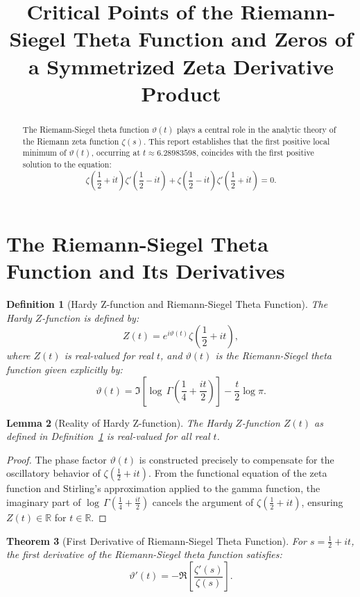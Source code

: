 \documentclass[11pt,a4paper]{article}
\title{Critical Points of the Riemann-Siegel Theta Function and Zeros of a Symmetrized Zeta Derivative Product}
\author{}
\date{}
\newtheorem{theorem}{Theorem}[section]
\newtheorem{lemma}[theorem]{Lemma}
\newtheorem{definition}[theorem]{Definition}
\begin{document}
\maketitle

\begin{abstract}
The Riemann-Siegel theta function $\vartheta(t)$ plays a central role in the analytic theory of the Riemann zeta function $\zeta(s)$. This report establishes that the first positive local minimum of $\vartheta(t)$, occurring at $t \approx 6.28983598$, coincides with the first positive solution to the equation:
$$\zeta\left(\frac{1}{2} + it\right)\zeta'\left(\frac{1}{2} - it\right) + \zeta\left(\frac{1}{2} - it\right)\zeta'\left(\frac{1}{2} + it\right) = 0.$$
\end{abstract}

\section{The Riemann-Siegel Theta Function and Its Derivatives}

\begin{definition}[Hardy Z-function and Riemann-Siegel Theta Function]\label{def:hardy-theta}
The Hardy $Z$-function is defined by:
$$Z(t) = e^{i\vartheta(t)} \zeta\left(\frac{1}{2} + it\right),$$
where $Z(t)$ is real-valued for real $t$, and $\vartheta(t)$ is the Riemann-Siegel theta function given explicitly by:
$$\vartheta(t) = \Im\left[\log\,\Gamma\left(\frac{1}{4} + \frac{it}{2}\right)\right] - \frac{t}{2} \log\pi.$$
\end{definition}

\begin{lemma}[Reality of Hardy Z-function]\label{lem:z-real}
The Hardy $Z$-function $Z(t)$ as defined in Definition~\ref{def:hardy-theta} is real-valued for all real $t$.
\end{lemma}

\begin{proof}
The phase factor $\vartheta(t)$ is constructed precisely to compensate for the oscillatory behavior of $\zeta\left(\frac{1}{2} + it\right)$. From the functional equation of the zeta function and Stirling's approximation applied to the gamma function, the imaginary part of $\log\,\Gamma\left(\frac{1}{4} + \frac{it}{2}\right)$ cancels the argument of $\zeta\left(\frac{1}{2} + it\right)$, ensuring $Z(t) \in \mathbb{R}$ for $t \in \mathbb{R}$.
\end{proof}

\begin{theorem}[First Derivative of Riemann-Siegel Theta Function]\label{thm:theta-prime}
For $s = \frac{1}{2} + it$, the first derivative of the Riemann-Siegel theta function satisfies:
$$\vartheta'(t) = -\Re\left[\frac{\zeta'(s)}{\zeta(s)}\right].$$
\end{theorem}
\end{document}

